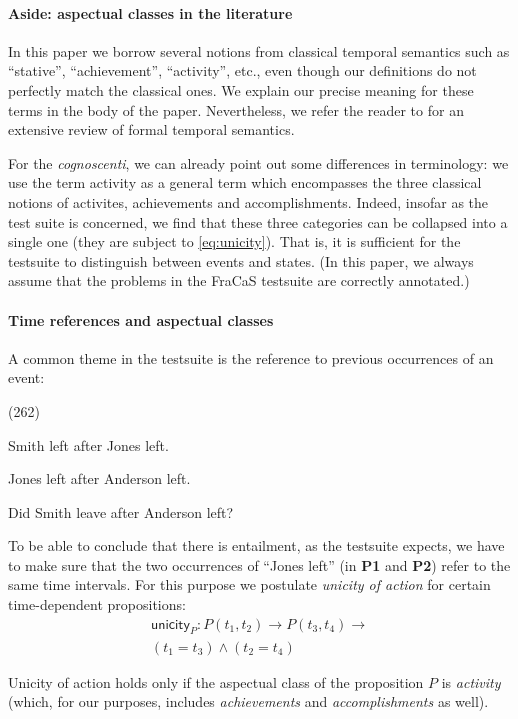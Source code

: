 \documentclass[11pt,a4paper]{article}
\newcommand\hyp{\item[H]}
\newcommand\fracasex[2]{\begin{lingex}\item[(#1)] \begin{subex} #2 \end{subex} \end{lingex} }
\newcommand\constant[1]{\mathsf{#1}}
\begin{document}
\paragraph{Aside: aspectual classes in the literature}
In this paper we borrow several notions from classical temporal
semantics such as ``stative'', ``achievement'', ``activity'', etc.,
even though our definitions do not perfectly match the classical
ones. We explain our precise meaning for these terms in the body of the
paper. Nevertheless, we refer the reader to \citet{steedman:2000} for
an extensive review of formal temporal semantics.

For the \textit{cognoscenti}, we can already point out some
differences in terminology: we use the term activity as a general term
which encompasses the three classical notions of activites,
achievements and accomplishments. Indeed, insofar as the test suite is
concerned, we find that these three categories can be collapsed into a
single one (they are subject to \cref{eq:unicity}).  That is, it is
sufficient for the testsuite to distinguish between events and
states. (In this paper, we always assume that the problems in the
FraCaS testsuite are correctly annotated.)

\paragraph{Time references and aspectual classes}

A common theme in the testsuite is the reference to previous
occurrences of an event:

\fracasex{262}{
\item	Smith left after Jones left.
\item	Jones left after Anderson left.
\hyp 	Did Smith leave after Anderson left?
}

To be able to conclude that there is entailment, as the testsuite expects, we have to make sure
that the two occurrences of ``Jones left'' (in \textbf{P1} and \textbf{P2}) refer to the
same time intervals.
%
For this purpose we postulate \emph{unicity of action} for certain time-dependent
propositions:
%
  \vspace{-1.5ex}
\begin{multline}
  \constant{unicity}_P : P (t_1,t_2) → P (t_3,t_4) → \\ (t_1 = t_3) ∧ (t_2 = t_4)
  \label{eq:unicity}
\end{multline}

Unicity of action holds only if the aspectual class of the proposition
$P$ is \emph{activity}~\citep{steedman_productions_2000} (which, for our
purposes, includes \emph{achievements} and \emph{accomplishments} as well).
\end{document}
